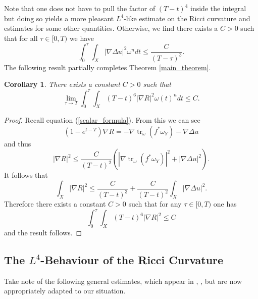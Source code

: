 \documentclass[12pt]{article}
\newtheorem{corollary}[theorem]{Corollary}
\numberwithin{equation}{section}
\DeclareMathOperator{\tr}{tr}
\begin{document}
\noindent Note that one does not have to pull the factor of $(T-t)^4$ inside the integral but doing so yields a more pleasant $L^4$-like estimate on the Ricci curvature and estimates for some other quantities. Otherwise, we find there exists a $C > 0$ such that for all $\tau \in [0,T)$ we have
\begin{equation}\label{alternate_bound}
    \int_0^\tau \int_X |\nabla \Delta u|^2 \omega^n dt \leq \frac{C}{(T-\tau)^3}.
\end{equation}
The following result partially completes Theorem \ref{main_theorem}.

\begin{corollary}
There exists a constant $C > 0$ such that
\begin{equation*}
    \lim_{\tau\to T} \int_0^\tau \int_X (T-t)^6 |\nabla R|^2 \omega(t)^n dt \leq C.
\end{equation*}
\end{corollary}

\begin{proof}
Recall equation (\ref{scalar_formula}). From this we can see
\begin{equation*}
    (1-e^{t-T}) \nabla R = -\nabla \tr_\omega(f^*\omega_Y) - \nabla \Delta u
\end{equation*}
and thus
\begin{equation*}
    |\nabla R|^2 \leq \frac{C}{(T-t)^2}(|\nabla \tr_\omega(f^*\omega_Y)|^2 + |\nabla \Delta u|^2).
\end{equation*}
It follows that 
\begin{equation*}
    \int_X |\nabla R|^2 \leq \frac{C}{(T-t)^3} + \frac{C}{(T-t)^2} \int_X |\nabla \Delta u|^2.
\end{equation*}
Therefore there exists a constant $C > 0$ such that for any $\tau \in [0,T)$ one has
\begin{equation*}
    \int_0^\tau \int_X (T-t)^6|\nabla R|^2 \leq C
\end{equation*}
and the result follows.
\end{proof}

\subsection{The $L^4$-Behaviour of the Ricci Curvature}

\noindent Take note of the following general estimates, which appear in \cite[Lem. 4.3]{TZ16}, \cite[Lem. 3.5]{TZ15}, but are now appropriately adapted to our situation.
\end{document}
